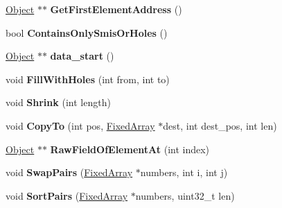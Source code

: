 \begin{DoxyCompactItemize}
\item 
\hyperlink{classv8_1_1internal_1_1_object}{Object} $\ast$$\ast$ {\bfseries Get\+First\+Element\+Address} ()\hypertarget{classv8_1_1internal_1_1_fixed_array_a764d034ed48aafab5f2652650539430c}{}\label{classv8_1_1internal_1_1_fixed_array_a764d034ed48aafab5f2652650539430c}

\item 
bool {\bfseries Contains\+Only\+Smis\+Or\+Holes} ()\hypertarget{classv8_1_1internal_1_1_fixed_array_a22676358d865881a11d55fdcc2cb8a8d}{}\label{classv8_1_1internal_1_1_fixed_array_a22676358d865881a11d55fdcc2cb8a8d}

\item 
\hyperlink{classv8_1_1internal_1_1_object}{Object} $\ast$$\ast$ {\bfseries data\+\_\+start} ()\hypertarget{classv8_1_1internal_1_1_fixed_array_a58637e5c3f9578918deeb899b6976734}{}\label{classv8_1_1internal_1_1_fixed_array_a58637e5c3f9578918deeb899b6976734}

\item 
void {\bfseries Fill\+With\+Holes} (int from, int to)\hypertarget{classv8_1_1internal_1_1_fixed_array_aad3f35474e49dd5143b5f2334926ce33}{}\label{classv8_1_1internal_1_1_fixed_array_aad3f35474e49dd5143b5f2334926ce33}

\item 
void {\bfseries Shrink} (int length)\hypertarget{classv8_1_1internal_1_1_fixed_array_a0365d2e06f63bcfe4acaace5b0eca1a0}{}\label{classv8_1_1internal_1_1_fixed_array_a0365d2e06f63bcfe4acaace5b0eca1a0}

\item 
void {\bfseries Copy\+To} (int pos, \hyperlink{classv8_1_1internal_1_1_fixed_array}{Fixed\+Array} $\ast$dest, int dest\+\_\+pos, int len)\hypertarget{classv8_1_1internal_1_1_fixed_array_a946fb06002793ff6e12c78f207f4b2a5}{}\label{classv8_1_1internal_1_1_fixed_array_a946fb06002793ff6e12c78f207f4b2a5}

\item 
\hyperlink{classv8_1_1internal_1_1_object}{Object} $\ast$$\ast$ {\bfseries Raw\+Field\+Of\+Element\+At} (int index)\hypertarget{classv8_1_1internal_1_1_fixed_array_aca67f50e7efcfbe5940f9a35b5c4a2aa}{}\label{classv8_1_1internal_1_1_fixed_array_aca67f50e7efcfbe5940f9a35b5c4a2aa}

\item 
void {\bfseries Swap\+Pairs} (\hyperlink{classv8_1_1internal_1_1_fixed_array}{Fixed\+Array} $\ast$numbers, int i, int j)\hypertarget{classv8_1_1internal_1_1_fixed_array_a1aeb180f8d130d58f4dd67bb65a0d1bb}{}\label{classv8_1_1internal_1_1_fixed_array_a1aeb180f8d130d58f4dd67bb65a0d1bb}

\item 
void {\bfseries Sort\+Pairs} (\hyperlink{classv8_1_1internal_1_1_fixed_array}{Fixed\+Array} $\ast$numbers, uint32\+\_\+t len)\hypertarget{classv8_1_1internal_1_1_fixed_array_a2ac505844e9cd989edc007b75dca925e}{}\label{classv8_1_1internal_1_1_fixed_array_a2ac505844e9cd989edc007b75dca925e}

\end{DoxyCompactItemize}
